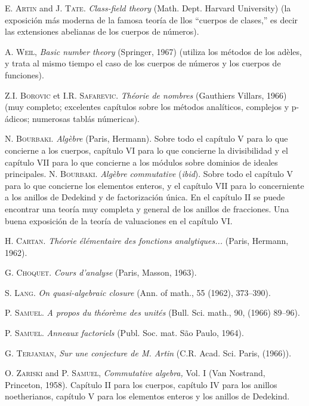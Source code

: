 \documentclass[bibtotoc,leqno,spanish]{amsbook}
\numberwithin{equation}{section}
\theoremstyle{note}
\theoremstyle{note}
\theoremstyle{rem}
\numberwithin{theorem}{section}
\numberwithin{proposition}{section}
\numberwithin{definition}{section}
\numberwithin{lemma}{section}
\numberwithin{corollary}{section}
\numberwithin{example}{section}
\numberwithin{footnote}{section}%
\begin{document}
\begin{thebibliography}{21}
\bibitem{} {\scshape E. Artin} and {\scshape J. Tate.} {\itshape Class-field theory}
(Math. Dept. Harvard University) (la exposici\'on m\'as moderna de la famosa teor\'ia de llos ``cuerpos de clases,''
es decir las extensiones abelianas de los cuerpos de n\'umeros).

\bibitem{} {\scshape A. Weil,} {\itshape Basic number theory} (Springer, 1967) (utiliza los m\'etodos
de los ad\`eles, y trata al mismo tiempo el caso de los cuerpos de n\'umeros y los cuerpos de funciones).

\bibitem{} {\scshape Z.I. Borovic} et {\scshape I.R. Safarevic.} {\itshape Th\'eorie de nombres}
(Gauthiers Villars, 1966)
(muy completo; excelentes cap\'itulos sobre los m\'etodos anal\'iticos, complejos y p-\'adicos; numerosas
tabl\'as n\'umericas).


 {\scshape N. Bourbaki.} {\itshape Alg\`ebre} (Paris, Hermann).
Sobre todo el cap\'itulo V para lo que concierne a los cuerpos,
cap\'itulo VI para lo que concierne la divisibilidad y el
cap\'itulo VII para lo que concierne a los m\'odulos sobre
dominios de ideales principales.
 {\scshape N. Bourbaki.} {\itshape Alg\`ebre commutative} (\textit{ibid}). Sobre todo el
cap\'itulo V para lo que concierne los elementos enteros, y el cap\'itulo VII para lo concerniente a los
anillos de Dedekind y de factorizaci\'on \'unica. En el cap\'itulo II se puede encontrar una teor\'ia muy
completa y general de los anillos de fracciones. Una buena exposici\'on de la teor\'ia de valuaciones en
el cap\'itulo VI.

 {\scshape H. Cartan.} {\itshape Th\'eorie \'el\'ementaire des fonctions analytiques...}
(Paris, Hermann, 1962).

 {\scshape G. Choquet.} {\itshape Cours d'analyse} (Paris, Masson, 1963).

 {\scshape S. Lang.} {\itshape On quasi-algebraic closure} (Ann. of math., 55 (1962), 373--390).

 {\scshape P. Samuel.} {\itshape A propos du th\'eor\`eme des unit\'es}
(Bull. Sci. math., 90, (1966) 89--96).

 {\scshape P. Samuel.} {\itshape Anneaux factoriels} (Publ. Soc. mat. S\~ao Paulo, 1964).

 {\scshape G. Terjanian,} {\itshape Sur une conjecture de M. Artin} (C.R. Acad. Sci. Paris,
(1966)).

 {\scshape O. Zariski} and {\scshape P. Samuel,} {\itshape Commutative algebra,} Vol. I
(Van Nostrand, Princeton, 1958). Cap\'itulo II para los cuerpos, cap\'itulo IV para los anillos noetherianos,
cap\'itulo V para los elementos enteros y los anillos de Dedekind.
\end{thebibliography}

\end{document}
